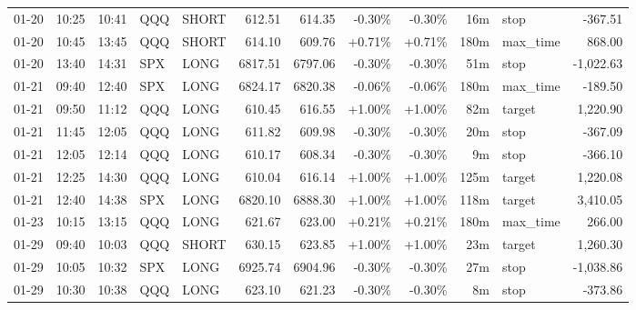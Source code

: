\documentclass[11pt,a4paper,twoside]{article}
\begin{document}
\begin{center}
\begin{longtable}{>{\color{txtmain}}l l l l l r r r r r >{\color{txtmain}}l r}
01-20 & 10:25 & 10:41 & QQQ & SHORT & 612.51 & 614.35 & \textcolor{lossred}{-0.30\%} & \textcolor{lossred}{-0.30\%} & 16m & stop & \textcolor{lossred}{-367.51} \\
01-20 & 10:45 & 13:45 & QQQ & SHORT & 614.10 & 609.76 & \textcolor{wingreen}{+0.71\%} & \textcolor{wingreen}{+0.71\%} & 180m & max\_time & \textcolor{wingreen}{868.00} \\
01-20 & 13:40 & 14:31 & SPX & LONG & 6817.51 & 6797.06 & \textcolor{lossred}{-0.30\%} & \textcolor{lossred}{-0.30\%} & 51m & stop & \textcolor{lossred}{-1,022.63} \\
01-21 & 09:40 & 12:40 & SPX & LONG & 6824.17 & 6820.38 & \textcolor{lossred}{-0.06\%} & \textcolor{lossred}{-0.06\%} & 180m & max\_time & \textcolor{lossred}{-189.50} \\
01-21 & 09:50 & 11:12 & QQQ & LONG & 610.45 & 616.55 & \textcolor{wingreen}{+1.00\%} & \textcolor{wingreen}{+1.00\%} & 82m & target & \textcolor{wingreen}{1,220.90} \\
01-21 & 11:45 & 12:05 & QQQ & LONG & 611.82 & 609.98 & \textcolor{lossred}{-0.30\%} & \textcolor{lossred}{-0.30\%} & 20m & stop & \textcolor{lossred}{-367.09} \\
01-21 & 12:05 & 12:14 & QQQ & LONG & 610.17 & 608.34 & \textcolor{lossred}{-0.30\%} & \textcolor{lossred}{-0.30\%} & 9m & stop & \textcolor{lossred}{-366.10} \\
01-21 & 12:25 & 14:30 & QQQ & LONG & 610.04 & 616.14 & \textcolor{wingreen}{+1.00\%} & \textcolor{wingreen}{+1.00\%} & 125m & target & \textcolor{wingreen}{1,220.08} \\
01-21 & 12:40 & 14:38 & SPX & LONG & 6820.10 & 6888.30 & \textcolor{wingreen}{+1.00\%} & \textcolor{wingreen}{+1.00\%} & 118m & target & \textcolor{wingreen}{3,410.05} \\
01-23 & 10:15 & 13:15 & QQQ & LONG & 621.67 & 623.00 & \textcolor{wingreen}{+0.21\%} & \textcolor{wingreen}{+0.21\%} & 180m & max\_time & \textcolor{wingreen}{266.00} \\
01-29 & 09:40 & 10:03 & QQQ & SHORT & 630.15 & 623.85 & \textcolor{wingreen}{+1.00\%} & \textcolor{wingreen}{+1.00\%} & 23m & target & \textcolor{wingreen}{1,260.30} \\
01-29 & 10:05 & 10:32 & SPX & LONG & 6925.74 & 6904.96 & \textcolor{lossred}{-0.30\%} & \textcolor{lossred}{-0.30\%} & 27m & stop & \textcolor{lossred}{-1,038.86} \\
01-29 & 10:30 & 10:38 & QQQ & LONG & 623.10 & 621.23 & \textcolor{lossred}{-0.30\%} & \textcolor{lossred}{-0.30\%} & 8m & stop & \textcolor{lossred}{-373.86} \\

\end{longtable}
\end{center}
\end{document}
